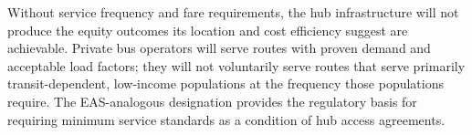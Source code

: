 Without service frequency and fare requirements, the hub infrastructure will not produce the equity outcomes its location and cost efficiency suggest are achievable. Private bus operators will serve routes with proven demand and acceptable load factors; they will not voluntarily serve routes that serve primarily transit-dependent, low-income populations at the frequency those populations require. The EAS-analogous designation provides the regulatory basis for requiring minimum service standards as a condition of hub access agreements.
